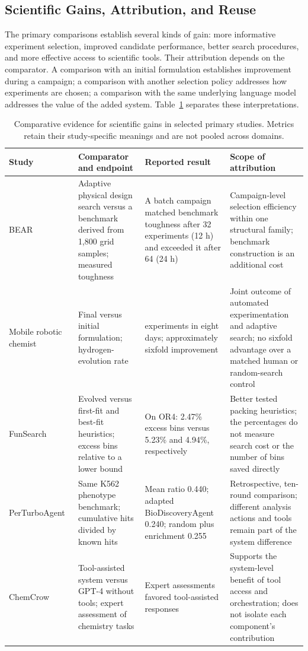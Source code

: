 \subsection{Scientific Gains, Attribution, and Reuse}
\label{sec:comparative-gains}

The primary comparisons establish several kinds of gain: more informative experiment selection, improved candidate performance, better search procedures, and more effective access to scientific tools. Their attribution depends on the comparator. A comparison with an initial formulation establishes improvement during a campaign; a comparison with another selection policy addresses how experiments are chosen; a comparison with the same underlying language model addresses the value of the added system. Table~\ref{tab:comparative-gains} separates these interpretations.

\begin{table}[H]
\caption{Comparative evidence for scientific gains in selected primary studies. Metrics retain their study-specific meanings and are not pooled across domains.}
\label{tab:comparative-gains}
\scriptsize
\begin{tabularx}{\textwidth}{@{}p{}>{\raggedright\arraybackslash}X>{\raggedright\arraybackslash}X>{\raggedright\arraybackslash}X@{}}
\toprule
Study & Comparator and endpoint & Reported result & Scope of attribution \\
\midrule
BEAR~\cite{asd0504} & Adaptive physical design search versus a benchmark derived from 1,800 grid samples; measured toughness & A batch campaign matched benchmark toughness after 32 experiments (12 h) and exceeded it after 64 (24 h) & Campaign-level selection efficiency within one structural family; benchmark construction is an additional cost \\
Mobile robotic chemist~\cite{burger2020} & Final versus initial formulation; hydrogen-evolution rate & 688 experiments in eight days; approximately sixfold improvement & Joint outcome of automated experimentation and adaptive search; no sixfold advantage over a matched human or random-search control \\
FunSearch~\cite{asd0512} & Evolved versus first-fit and best-fit heuristics; excess bins relative to a lower bound & On OR4: 2.47\% excess bins versus 5.23\% and 4.94\%, respectively & Better tested packing heuristics; the percentages do not measure search cost or the number of bins saved directly \\
Per\-Turbo\-Agent~\cite{asd0034} & Same K562 phenotype benchmark; cumulative hits divided by known hits & Mean ratio 0.440; adapted BioDiscoveryAgent 0.240; random plus enrichment 0.255 & Retrospective, ten-round comparison; different analysis actions and tools remain part of the system difference \\
ChemCrow~\cite{bran2024} & Tool-assisted system versus GPT-4 without tools; expert assessment of chemistry tasks & Expert assessments favored tool-assisted responses & Supports the system-level benefit of tool access and orchestration; does not isolate each component's contribution \\
\bottomrule
\end{tabularx}
\end{table}

